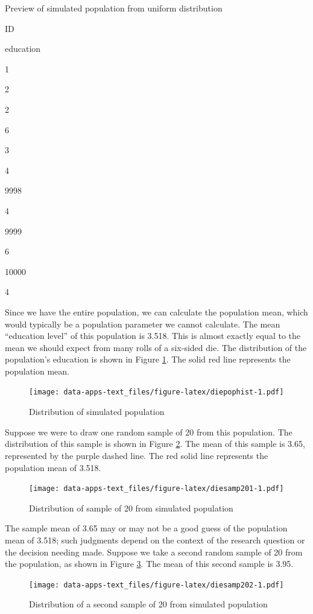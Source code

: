 \documentclass[
]{book}
\begin{document}
\label{tab:diepop}Preview of simulated population from uniform distribution

ID

education

1

2

2

6

3

4

9998

4

9999

6

10000

4

Since we have the entire population, we can calculate the population mean, which would typically be a population parameter we cannot calculate. The mean ``education level'' of this population is 3.518. This is almost exactly equal to the mean we should expect from many rolls of a six-sided die. The distribution of the population's education is shown in Figure \ref{fig:diepophist}. The solid red line represents the population mean.

\begin{figure}
\centering
\texttt{[image: data-apps-text\_files/figure-latex/diepophist-1.pdf]}
\caption{\label{fig:diepophist}Distribution of simulated population}
\end{figure}

Suppose we were to draw one random sample of 20 from this population. The distribution of this sample is shown in Figure \ref{fig:diesamp201}. The mean of this sample is 3.65, represented by the purple dashed line. The red solid line represents the population mean of 3.518.

\begin{figure}
\centering
\texttt{[image: data-apps-text\_files/figure-latex/diesamp201-1.pdf]}
\caption{\label{fig:diesamp201}Distribution of sample of 20 from simulated population}
\end{figure}

The sample mean of 3.65 may or may not be a good guess of the population mean of 3.518; such judgments depend on the context of the research question or the decision needing made. Suppose we take a second random sample of 20 from the population, as shown in Figure \ref{fig:diesamp202}. The mean of this second sample is 3.95.

\begin{figure}
\centering
\texttt{[image: data-apps-text\_files/figure-latex/diesamp202-1.pdf]}
\caption{\label{fig:diesamp202}Distribution of a second sample of 20 from simulated population}
\end{figure}
\end{document}
